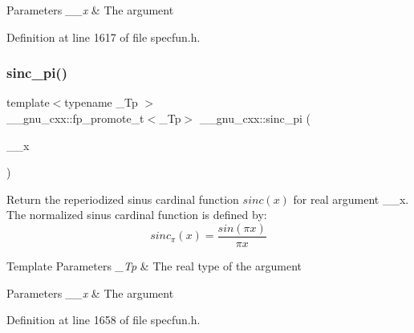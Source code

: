 \begin{DoxyParams}{Parameters}
{\em \+\_\+\+\_\+x} & The argument \\
\hline
\end{DoxyParams}


Definition at line 1617 of file specfun.\+h.

\mbox{\label{group__gnu__math__spec__func_ga5195270024403b985e7d4f2f935f8779}} 
\subsubsection{\texorpdfstring{sinc\+\_\+pi()}{sinc\_pi()}}
{\footnotesize\ttfamily template$<$typename \+\_\+\+Tp $>$ \\
\+\_\+\+\_\+gnu\+\_\+cxx\+::fp\+\_\+promote\+\_\+t$<$\+\_\+\+Tp$>$ \+\_\+\+\_\+gnu\+\_\+cxx\+::sinc\+\_\+pi (\begin{DoxyParamCaption}\item[{\+\_\+\+Tp}]{\+\_\+\+\_\+x }\end{DoxyParamCaption})\hspace{0.3cm}{\ttfamily [inline]}}

Return the reperiodized sinus cardinal function $ sinc(x) $ for real argument {\ttfamily \+\_\+\+\_\+x}. The normalized sinus cardinal function is defined by\+: \[ sinc_\pi(x) = \frac{sin(\pi x)}{\pi x} \]


\begin{DoxyTemplParams}{Template Parameters}
{\em \+\_\+\+Tp} & The real type of the argument \\
\hline
\end{DoxyTemplParams}

\begin{DoxyParams}{Parameters}
{\em \+\_\+\+\_\+x} & The argument \\
\hline
\end{DoxyParams}


Definition at line 1658 of file specfun.\+h.

\mbox{\label{group__gnu__math__spec__func_gad92d43d5332c80d1a27c90bfe3f6417e}} 
